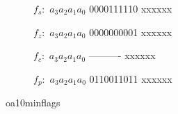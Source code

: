 \begin{figure}[H]
	\begin{subfigure}[b]{0.3\textwidth}
	{$f_s:$}%
	{{$a_3$}{$a_2$}{$a_1$}{$a_0$}}%
	{0000111110%
	 xxxxxx}%
	{%
	}
	\caption{}
	\label{figure:oa10_min_fs}
	\end{subfigure}
	\qquad
	\begin{subfigure}[b]{0.3\textwidth}
	{$f_z:$}%
	{{$a_3$}{$a_2$}{$a_1$}{$a_0$}}%
	{0000000001%
	 xxxxxx}%
	{%
	}
	\caption{}
	\label{figure:oa10_min_fz}
	\end{subfigure}

	\begin{subfigure}[b]{0.3\textwidth}
	{$f_c:$}%
	{{$a_3$}{$a_2$}{$a_1$}{$a_0$}}%
	{----------%
	 xxxxxx}%
	{%
	}
	\caption{}
	\label{figure:oa10_min_fc}
	\end{subfigure}
	\qquad
	\begin{subfigure}[b]{0.3\textwidth}
	{$f_p:$}%
	{{$a_3$}{$a_2$}{$a_1$}{$a_0$}}%
	{0110011011%
	 xxxxxx}%
	{%
	}
	\caption{}
	\label{figure:oa10_min_fp}
	\end{subfigure}	
	
	\caption{oa10minflags}
	\label{figure:oa10_min_flags}
\end{figure}
